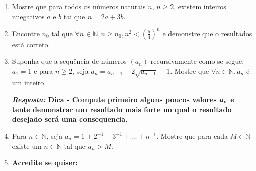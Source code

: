 \begin{enumerate}[{\bf 1.}]
\begin{enumerate}[a)]
{\bf{\it Resposta:} Quando ${\bf n=2}$ temos ${\bf 1-\frac{1}{2}=\frac{1}{2} }$, que claramente é verdade. Agora suponha que ${\bf k\in\mathbb{N}}$ e ${\bf (1-\frac{1}{2})(1-\frac{1}{3})\ldots(1-\frac{1}{k})=\frac{1}{k}}$, então
\begin{eqnarray*}
{\bf \left(1-\frac{1}{2}\right)\left(1-\frac{1}{3}\right)\ldots\left(1-\frac{1}{k}\right)\left(1-\frac{1}{k+1}\right)}&=&{\bf  \frac{1}{k}\left(1-\frac{1}{k+1}\right)}\\
                          &=&{\bf  \frac{1}{k}-\frac{1}{k(k+1)}}\\
                          &=&{\bf  \frac{(k+1)-1}{k(k+1)}}\\
                          &=&{\bf  \frac{k}{k(k+1)}}\\
                          &=&{\bf  \frac{1}{k+1}},
\end{eqnarray*}  
logo \'e verdade para ${\bf k+1}$, que completa o passo de indu\cao e assim a demonstra\cao por indu\caoi.}

\item $\forall n\in\mathbb{N}, (1-\frac{1}{2^2})(1-\frac{1}{3^2})\ldots(1-\frac{1}{n^2})=\frac{1}{2}(1+\frac{1}{n})$.
\end{enumerate}

\item Mostre que para todos os n\'umeros naturais $n$, $n\geq 2$, existem inteiros n\ao negativos $a$ e $b$ tai que $n=2a+3b$.

\item Encontre $n_0$ tal que $\forall n\in\mathbb{N}, n\geq n_0, n^2<(\frac{5}{4})^n$ e demonstre que o resultados est\'a correto.

\item Suponha que a sequ\^encia de n\'umeros $(a_n)$ recursivamente como se segue: $a_1=1$ e para $n\geq 2$, seja $a_n=a_{n-1}+2\sqrt{a_{n-1}}+1$. Mostre que $\forall n\in\mathbb{N}, a_n$ \'e um inteiro.

{\bf{\it Resposta:} Dica - Compute primeiro alguns poucos valores ${\bf a_n}$ e tente demonstrar um resultado mais forte no qual o resultado desejado ser\'a uma consequencia.}

\item Para $n\in\mathbb{N}$, seja $a_n=1+2^{-1}+3^{-1}+\ldots+n^{-1}$. Mostre que para cada $M\in\mathbb{N}$ existe um $n\in\mathbb{N}$ tal que $a_n>M$.

\item {\bf Acredite se quiser:}   


\end{enumerate}
